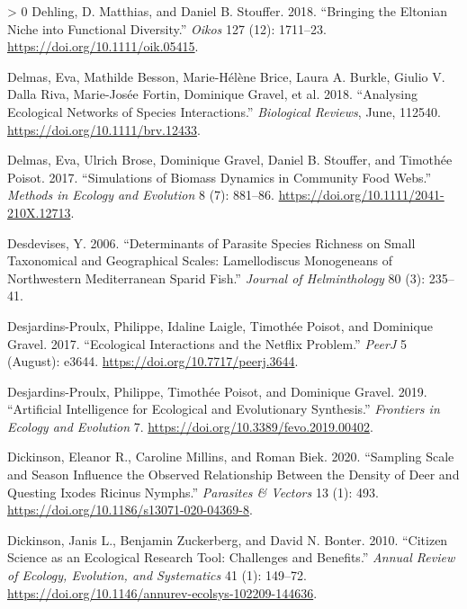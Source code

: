 \documentclass[10pt,oneside]{article}
\newlength{\cslhangindent}
\newenvironment{CSLReferences}[3] %
 {%
  \setlength{\parindent}{0pt}
  \ifodd #1 \everypar{\setlength{\hangindent}{\cslhangindent}}\ignorespaces\fi
  \ifnum #2 > 0
  \setlength{\parskip}{#2\baselineskip}
  \fi
 }%
 {}
\begin{document}
\begin{CSLReferences}{1}{0}
\leavevmode\hypertarget{ref-Dehling2018BriElt}{}%
Dehling, D. Matthias, and Daniel B. Stouffer. 2018. {``Bringing the
Eltonian Niche into Functional Diversity.''} \emph{Oikos} 127 (12):
1711--23. \url{https://doi.org/10.1111/oik.05415}.

\leavevmode\hypertarget{ref-Delmas2018AnaEco}{}%
Delmas, Eva, Mathilde Besson, Marie-Hélène Brice, Laura A. Burkle,
Giulio V. Dalla Riva, Marie-Josée Fortin, Dominique Gravel, et al. 2018.
{``Analysing Ecological Networks of Species Interactions.''}
\emph{Biological Reviews}, June, 112540.
\url{https://doi.org/10.1111/brv.12433}.

\leavevmode\hypertarget{ref-Delmas2017SimBio}{}%
Delmas, Eva, Ulrich Brose, Dominique Gravel, Daniel B. Stouffer, and
Timothée Poisot. 2017. {``Simulations of Biomass Dynamics in Community
Food Webs.''} \emph{Methods in Ecology and Evolution} 8 (7): 881--86.
\url{https://doi.org/10.1111/2041-210X.12713}.

\leavevmode\hypertarget{ref-Desdevises2006DetPar}{}%
Desdevises, Y. 2006. {``Determinants of Parasite Species Richness on
Small Taxonomical and Geographical Scales: Lamellodiscus Monogeneans of
Northwestern Mediterranean Sparid Fish.''} \emph{Journal of
Helminthology} 80 (3): 235--41.

\leavevmode\hypertarget{ref-Desjardins-Proulx2017EcoInt}{}%
Desjardins-Proulx, Philippe, Idaline Laigle, Timothée Poisot, and
Dominique Gravel. 2017. {``Ecological Interactions and the Netflix
Problem.''} \emph{PeerJ} 5 (August): e3644.
\url{https://doi.org/10.7717/peerj.3644}.

\leavevmode\hypertarget{ref-Desjardins-Proulx2019ArtInt}{}%
Desjardins-Proulx, Philippe, Timothée Poisot, and Dominique Gravel.
2019. {``Artificial Intelligence for Ecological and Evolutionary
Synthesis.''} \emph{Frontiers in Ecology and Evolution} 7.
\url{https://doi.org/10.3389/fevo.2019.00402}.

\leavevmode\hypertarget{ref-Dickinson2020SamSca}{}%
Dickinson, Eleanor R., Caroline Millins, and Roman Biek. 2020.
{``Sampling Scale and Season Influence the Observed Relationship Between
the Density of Deer and Questing Ixodes Ricinus Nymphs.''}
\emph{Parasites \& Vectors} 13 (1): 493.
\url{https://doi.org/10.1186/s13071-020-04369-8}.

\leavevmode\hypertarget{ref-Dickinson2010CitSci}{}%
Dickinson, Janis L., Benjamin Zuckerberg, and David N. Bonter. 2010.
{``Citizen Science as an Ecological Research Tool: Challenges and
Benefits.''} \emph{Annual Review of Ecology, Evolution, and Systematics}
41 (1): 149--72.
\url{https://doi.org/10.1146/annurev-ecolsys-102209-144636}.


\end{CSLReferences}
\end{document}
